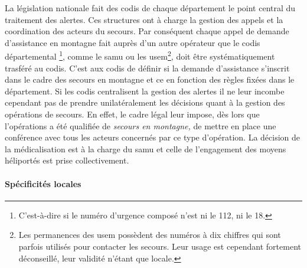 La législation nationale fait des \ac{codis} de chaque département le
point central du traitement des alertes. Ces structures ont à charge
la gestion des appels et la coordination des acteurs du secours. Par
conséquent chaque appel de demande d'assistance en montagne fait
auprès d'un autre opérateur que le \ac{codis} départemental
\footnote{C'est-à-dire si le numéro d'urgence composé n'est ni le 112,
  ni le 18.}, comme le \ac{samu} ou les \ac{usem}\footnote{Les
  permanences des \ac{usem} possèdent des numéros à dix chiffres qui
  sont parfois utilisés pour contacter les secours. Leur usage est
  cependant fortement déconseillé, leur validité n'étant que locale.},
doit être systématiquement trasféré au \ac{codis}. C'est aux
\ac{codis} de définir si la demande d'assistance s'inscrit dans le
cadre des secours en montagne et ce en fonction des règles fixées dans
le département.  Si les \ac{codis} centralisent la gestion des alertes
il ne leur incombe cependant pas de prendre unilatéralement les
décisions quant à la gestion des opérations de secours. En effet, le
cadre légal leur impose, dès lors que l'opérations a été qualifiée de
\emph{secours en montagne,} de mettre en place une conférence avec
tous les acteurs concernés par ce type d'opération. La décision de la
médicalisation est à la charge du \ac{samu} et celle de l'engagement
des moyens héliportés est prise collectivement.

\paragraph{Spécificités locales}

